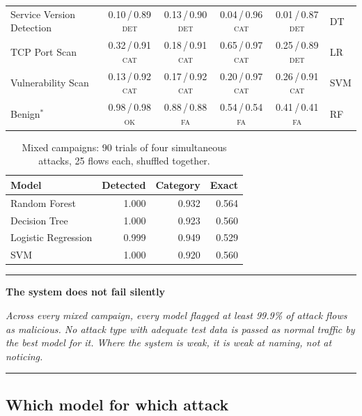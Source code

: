 \documentclass[11pt, a4paper]{article}
\newenvironment{finding}[1]
    {\par\medskip\noindent\textcolor{primary}{\rule{\textwidth}{1pt}}\par\nobreak
     \smallskip\noindent\textbf{\textcolor{primary}{#1}}\par\nobreak\smallskip\itshape}
    {\par\smallskip\noindent\textcolor{primary}{\rule{\textwidth}{1pt}}\par\medskip}
\begin{document}
\begin{table}[h]
\begin{tabular}{lccccl}
Service Version Detection & 0.10\,/\,0.89 \textsc{det} & 0.13\,/\,0.90 \textsc{det} & 0.04\,/\,0.96 \textsc{cat} & 0.01\,/\,0.87 \textsc{det} & DT \\
TCP Port Scan & 0.32\,/\,0.91 \textsc{cat} & 0.18\,/\,0.91 \textsc{cat} & 0.65\,/\,0.97 \textsc{cat} & 0.25\,/\,0.89 \textsc{det} & LR \\
Vulnerability Scan & 0.13\,/\,0.92 \textsc{cat} & 0.17\,/\,0.92 \textsc{cat} & 0.20\,/\,0.97 \textsc{cat} & 0.26\,/\,0.91 \textsc{cat} & SVM \\
\midrule
Benign$^{*}$ & 0.98\,/\,0.98 \textsc{ok} & 0.88\,/\,0.88 \textsc{fa} & 0.54\,/\,0.54 \textsc{fa} & 0.41\,/\,0.41 \textsc{fa} & RF \\
\bottomrule
\end{tabular}
\end{table}

\begin{table}[h]
\centering
\caption{Mixed campaigns: 90 trials of four simultaneous attacks,
         25 flows each, shuffled together.}
\begin{tabular}{lrrr}
\toprule
\textbf{Model} & \textbf{Detected} & \textbf{Category} & \textbf{Exact} \\
\midrule
Random Forest & 1.000 & 0.932 & 0.564 \\
Decision Tree & 1.000 & 0.923 & 0.560 \\
Logistic Regression & 0.999 & 0.949 & 0.529 \\
SVM & 1.000 & 0.920 & 0.560 \\
\bottomrule
\end{tabular}
\end{table}

\begin{finding}{The system does not fail silently}
Across every mixed campaign, every model flagged at least 99.9\% of attack flows
as malicious. No attack type with adequate test data is passed as normal
traffic by the best model for it. Where the system is weak, it is weak at
\emph{naming}, not at \emph{noticing}.
\end{finding}

\subsection{Which model for which attack}
\end{document}
